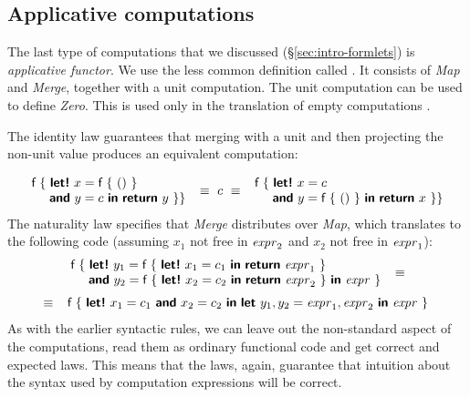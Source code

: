 \documentclass[runningheads,a4paper]{llncs}
\begin{document}

\subsection{Applicative computations}
\label{sec:laws-appl}

The last type of computations that we discussed (\S\ref{sec:intro-formlets}) is \emph{applicative functor}.
We use the less common definition called  \cite{applicative}. It consists of \emph{Map} 
and \emph{Merge}, together with a unit computation. The unit computation can be used to define
\emph{Zero}. This is used only in the translation of empty computations .

The identity law guarantees that merging with a unit and then projecting the non-unit value
produces an equivalent computation:

\begin{equation*}
\begin{array}{l}
\ident{f}~\{~  \kvd{let!}~x = \ident{f}~\{~()~\}\\
\hspace{1.4em} \kvd{and}~y = c~\kvd{in}~\kvd{return}~y~\}
\}
\end{array}
~\equiv~ c ~\equiv~
\begin{array}{l}
\ident{f}~\{~  \kvd{let!}~x = c\\
\hspace{1.4em} \kvd{and}~y = \ident{f}~\{~()~\}~\kvd{in}~\kvd{return}~x~\}
\}
\end{array}
\end{equation*}
%
The naturality law specifies that \emph{Merge} distributes over \emph{Map}, which translates to
the following code (assuming $x_1$ not free in $\textnormal{\emph{expr}}_2$ and $x_2$ not free in $\textnormal{\emph{expr}}_1$):
%
\begin{equation*}
\begin{array}{c}
\begin{array}{l}
\ident{f}~\{~ \kvd{let!}~y_1 = \ident{f}~\{~\kvd{let!}~x_1 = c_1~\kvd{in}~\kvd{return}~\expr_1 ~\} \\
\hspace{1.40em}   \kvd{and}~y_2 = \ident{f}~\{~\kvd{let!}~x_2 = c_2~\kvd{in}~\kvd{return}~\expr_2 ~\}~\kvd{in}~ \expr~\}
\end{array} ~\equiv~
\\[1.2em]
~\equiv~
\begin{array}{l}
\ident{f}~\{~ \kvd{let!}~x_1 = c_1~\kvd{and}~x_2 = c_2~\kvd{in}~ 
              \kvd{let}~y_1, y_2 = \expr_1, \expr_2~\kvd{in}~ \expr~\}
\end{array}
\end{array}
\end{equation*}
%
As with the earlier syntactic rules, we can leave out the non-standard aspect
of the computations, read them as ordinary functional code and get correct and 
expected laws. This means that the laws, again, guarantee that intuition about the
syntax used by computation expressions will be correct.
\end{document}
